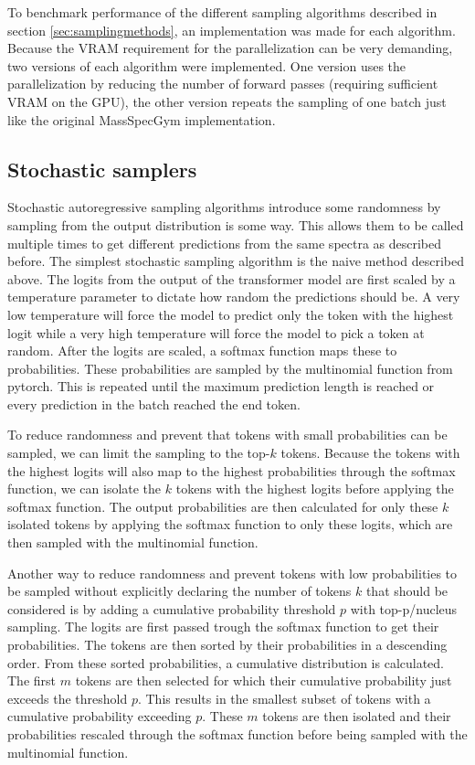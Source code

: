 To benchmark performance of the different sampling algorithms described in section \ref{sec:samplingmethods}, an implementation was made for each algorithm.
Because the VRAM requirement for the parallelization can be very demanding, two versions of each algorithm were implemented. 
One version uses the parallelization by reducing the number of forward passes (requiring sufficient VRAM on the GPU), the other version repeats the sampling of one batch just like the original MassSpecGym implementation.

\subsection{Stochastic samplers}

Stochastic autoregressive sampling algorithms introduce some randomness by sampling from the output distribution is some way.
This allows them to be called multiple times to get different predictions from the same spectra as described before.
The simplest stochastic sampling algorithm is the naive method described above.
The logits from the output of the transformer model are first scaled by a temperature parameter to dictate how random the predictions should be.
A very low temperature will force the model to predict only the token with the highest logit while a very high temperature will force the model to pick a token at random.
After the logits are scaled, a softmax function maps these to probabilities. These probabilities are sampled by the multinomial function from pytorch.
This is repeated until the maximum prediction length is reached or every prediction in the batch reached the end token.

To reduce randomness and prevent that tokens with small probabilities can be sampled, we can limit the sampling to the top-$k$ tokens.
Because the tokens with the highest logits will also map to the highest probabilities through the softmax function,
we can isolate the $k$ tokens with the highest logits before applying the softmax function.
The output probabilities are then calculated for only these $k$ isolated tokens by applying the softmax function to only these logits, which are then sampled with the multinomial function.

Another way to reduce randomness and prevent tokens with low probabilities to be sampled without explicitly declaring the number of tokens $k$ that should be considered is by adding a cumulative probability threshold $p$ with top-p/nucleus sampling.
The logits are first passed trough the softmax function to get their probabilities.
The tokens are then sorted by their probabilities in a descending order.
From these sorted probabilities, a cumulative distribution is calculated.
The first $m$ tokens are then selected for which their cumulative probability just exceeds the threshold $p$.
This results in the smallest subset of tokens with a cumulative probability exceeding $p$.
These $m$ tokens are then isolated and their probabilities rescaled through the softmax function before being sampled with the multinomial function.

